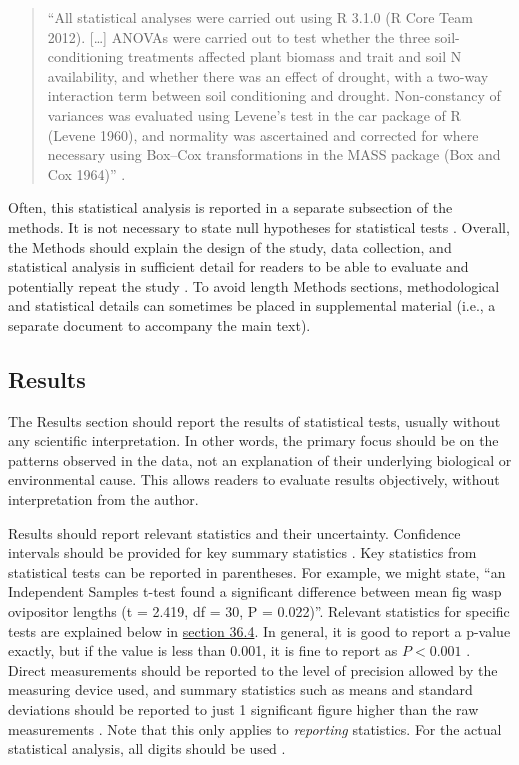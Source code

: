 \documentclass[
]{scrbook}
\begin{document}
\begin{quote}
``All statistical analyses were carried out using R 3.1.0 (R Core Team 2012). {[}\ldots{]} ANOVAs were carried out to test whether the three soil-conditioning treatments affected plant biomass and trait and soil N availability, and whether there was an effect of drought, with a two-way interaction term between soil conditioning and drought. Non-constancy of variances was evaluated using Levene's test in the car package of R (Levene 1960), and normality was ascertained and corrected for where necessary using Box--Cox transformations in the MASS package (Box and Cox 1964)'' \citep{Fry2018}.
\end{quote}

Often, this statistical analysis is reported in a separate subsection of the methods.
It is not necessary to state null hypotheses for statistical tests \citep{Lang1997}.
Overall, the Methods should explain the design of the study, data collection, and statistical analysis in sufficient detail for readers to be able to evaluate and potentially repeat the study \citep{Woodford1999}.
To avoid length Methods sections, methodological and statistical details can sometimes be placed in supplemental material (i.e., a separate document to accompany the main text).

\hypertarget{results}{%
\subsection{Results}\label{results}}

The Results section should report the results of statistical tests, usually without any scientific interpretation.
In other words, the primary focus should be on the patterns observed in the data, not an explanation of their underlying biological or environmental cause.
This allows readers to evaluate results objectively, without interpretation from the author.

Results should report relevant statistics and their uncertainty.
Confidence intervals should be provided for key summary statistics \citep{Lang1997}.
Key statistics from statistical tests can be reported in parentheses.
For example, we might state, ``an Independent Samples t-test found a significant difference between mean fig wasp ovipositor lengths (t = 2.419, df = 30, P = 0.022)''.
Relevant statistics for specific tests are explained below in \protect\hyperlink{statistical-tests}{section 36.4}.
In general, it is good to report a p-value exactly, but if the value is less than 0.001, it is fine to report as \(P < 0.001\) \citep{council2006scientific}.
Direct measurements should be reported to the level of precision allowed by the measuring device used, and summary statistics such as means and standard deviations should be reported to just 1 significant figure higher than the raw measurements \citep{council2006scientific}.
Note that this only applies to \emph{reporting} statistics.
For the actual statistical analysis, all digits should be used \citep{Lang1997}.
\end{document}
